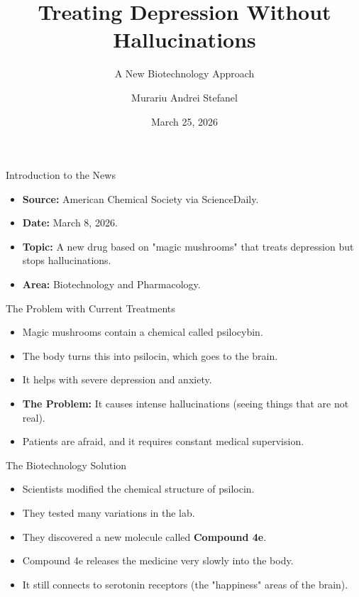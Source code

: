 \documentclass{beamer}
\title{Treating Depression Without Hallucinations}
\subtitle{A New Biotechnology Approach}
\author{Murariu Andrei Stefanel}
\date{March 25, 2026}
\begin{document}
\begin{frame}
\titlepage
\end{frame}

\begin{frame}{Introduction to the News}
\begin{itemize}
    \item \textbf{Source:} American Chemical Society via ScienceDaily.
    \item \textbf{Date:} March 8, 2026.
    \item \textbf{Topic:} A new drug based on "magic mushrooms" that treats depression but stops hallucinations.
    \item \textbf{Area:} Biotechnology and Pharmacology.
\end{itemize}
\vspace{0.3cm}
\end{frame}

\begin{frame}{The Problem with Current Treatments}
\begin{itemize}
    \item Magic mushrooms contain a chemical called psilocybin.
    \item The body turns this into psilocin, which goes to the brain.
    \item It helps with severe depression and anxiety.
    \item \textbf{The Problem:} It causes intense hallucinations (seeing things that are not real).
    \item Patients are afraid, and it requires constant medical supervision.
\end{itemize}
\end{frame}

\begin{frame}{The Biotechnology Solution}
\begin{itemize}
    \item Scientists modified the chemical structure of psilocin.
    \item They tested many variations in the lab.
    \item They discovered a new molecule called \textbf{Compound 4e}.
    \item Compound 4e releases the medicine very slowly into the body.
    \item It still connects to serotonin receptors (the "happiness" areas of the brain).
\end{itemize}
\end{frame}
\end{document}
